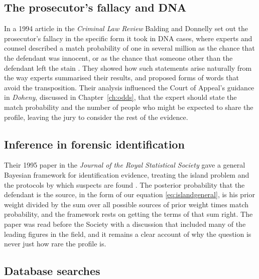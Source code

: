 \subsection{The prosecutor's fallacy and DNA}

In a 1994 article in the \emph{Criminal Law Review} Balding and Donnelly set out the prosecutor's fallacy in the specific form it took in DNA cases, where experts and counsel described a match probability of one in several million as the chance that the defendant was innocent, or as the chance that someone other than the defendant left the stain \citep{balding1994}. They showed how such statements arise naturally from the way experts summarised their results, and proposed forms of words that avoid the transposition. Their analysis influenced the Court of Appeal's guidance in \emph{Doheny}, discussed in Chapter~\ref{ch:odds}, that the expert should state the match probability and the number of people who might be expected to share the profile, leaving the jury to consider the rest of the evidence.

\subsection{Inference in forensic identification}

Their 1995 paper in the \emph{Journal of the Royal Statistical Society} gave a general Bayesian framework for identification evidence, treating the island problem and the protocols by which suspects are found \citep{balding1995}. The posterior probability that the defendant is the source, in the form of our equation \eqref{eq:islandgeneral}, is his prior weight divided by the sum over all possible sources of prior weight times match probability, and the framework rests on getting the terms of that sum right. The paper was read before the Society with a discussion that included many of the leading figures in the field, and it remains a clear account of why the question is never just how rare the profile is.

\subsection{Database searches}

